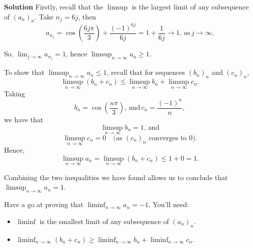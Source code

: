 \documentclass[
  17pt,
  a4paper]{extarticle}
\providecommand{\tightlist}{%
  \setlength{\itemsep}{0pt}\setlength{\parskip}{0pt}}
\theoremstyle{plain}
\theoremstyle{definition}
\theoremstyle{plain}
\theoremstyle{plain}
\theoremstyle{plain}
\theoremstyle{plain}
\theoremstyle{definition}
\theoremstyle{definition}
\theoremstyle{remark}
\theoremstyle{remark}
\renewcommand{\;}{\,}
\begin{document}
\textbf{Solution}
Firstly, recall that the \(\limsup\) is the largest limit of any subsequence of \((a_n)_n\). Take \(n_j = 6j\), then \[a_{n_j} = \cos\left(\frac{6j\pi}{3}\right) + \frac{(-1)^{6j}}{6j} = 1 + \frac{1}{6j} \to 1, \; \text{as} \; j \to \infty.\]

So, \(\lim_{j \to \infty} a_{n_j} = 1\), hence \(\limsup_{n \to \infty} a_n \geq 1\).

To show that \(\limsup_{n \to \infty} a_n \leq 1\), recall that for sequences \((b_n)_n\) and \((c_n)_n\), \[\limsup_{n \to \infty}(b_n + c_n) \leq \limsup_{n \to \infty}b_n + \limsup_{n \to \infty}c_n.\] Taking \[b_n = \cos\left(\frac{n\pi}{3}\right), \; \text{and} \; c_n = \frac{(-1)^n}{n},\] we have that \[\limsup_{n \to \infty} b_n = 1, \; \text{and}\] \[\limsup_{n \to \infty} c_n = 0 \quad \text{(as $(c_n)_n$ converges to $0$)}.\] Hence,
\[\limsup_{n \to \infty} a_n = \limsup_{n \to \infty}(b_n + c_n) \leq 1 + 0 = 1.\]

Combining the two inequalities we have found allows us to conclude that \(\limsup_{n \to \infty} a_n = 1.\)

Have a go at proving that \(\liminf_{n \to \infty} a_n = -1\). You'll need:

\begin{itemize}
\tightlist
\item
  \(\liminf\) is the smallest limit of any subsequence of \((a_n)_n\).
\item
  \(\liminf_{n \to \infty}(b_n + c_n) \geq \liminf_{n \to \infty}b_n + \liminf_{n \to \infty}c_n.\)
\end{itemize}
\end{document}
